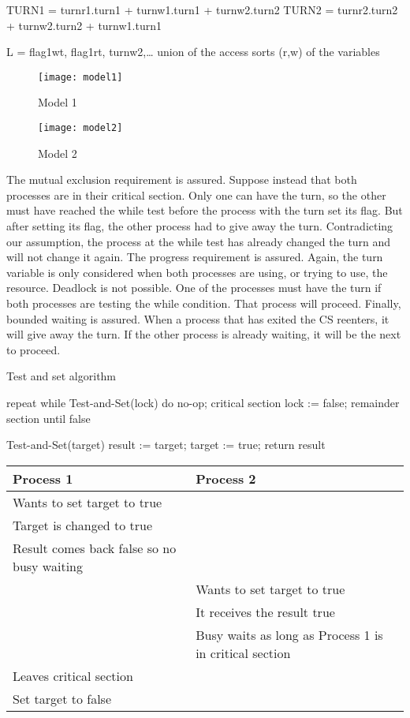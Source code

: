 TURN1 = turnr1.turn1 + turnw1.turn1 + turnw2.turn2
TURN2 = turnr2.turn2 + turnw2.turn2 + turnw1.turn1

L = { flag1wt, flag1rt, turnw2,… union of the access sorts (r,w) of the
variables }

\begin{figure}[h!]
\centering
\texttt{[image: model1]}
\caption{Model 1}
\label{fig:model1}
\end{figure}

\begin{figure}[h!]
\centering
\texttt{[image: model2]}
\caption{Model 2}
\label{fig:model2}
\end{figure}

The mutual exclusion requirement is assured. Suppose instead that both processes are in their critical section. 
Only one can have the turn, so the other must have reached the while test before the process with the turn set its flag. 
But after setting its flag, the other process had to give away the turn. 
Contradicting our assumption, the process at the while test has already changed the turn and will not change it again.
	The progress requirement is assured. 
	Again, the turn variable is only considered when both processes are using, or trying to use, the resource.
	Deadlock is not possible. One of the processes must have the turn if both processes are testing the while condition. 
	That process will proceed.
	Finally, bounded waiting is assured. When a process that has exited the CS reenters, it will give away the turn. 
	If the other process is already waiting, it will be the next to proceed.

Test and set algorithm

repeat
while Test-and-Set(lock) do no-op;
critical section 
lock := false;
remainder section 
until false 

Test-and-Set(target) 
result := target;
target := true; 
return result 

\begin{tabular}{ | l | l | }
  \hline                       
  Process 1	& Process 2 \\ \hline 
  Wants to set target to true & \\
  Target is changed to true & \\
  Result comes back false so no busy waiting &\\
  & Wants to set target to true \\
  & It receives the result true \\
  & Busy waits as long as Process 1 is in critical section \\
  Leaves critical section & \\
  Set target to false & \\
  \hline  
\end{tabular}
